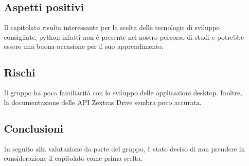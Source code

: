 \documentclass[../studio_di_fattibilita.tex]{subfiles}
\begin{document}
\subsection{Aspetti positivi}%
\label{sub:c7_aspetti_positivi}
Il capitolato risulta interessante per la scelta delle tecnologie di sviluppo consigliate, python infatti non è presente nel nostro percorso di studi e potrebbe essere una buona occasione per il suo apprendimento.

\subsection{Rischi}%
\label{sub:c7_rischi}
Il gruppo ha poca familiarità con lo sviluppo delle applicazioni desktop. Inoltre, la documentazione delle API Zextras Drive sembra poco accurata.
\subsection{Conclusioni}%
\label{sub:c7_conclusioni}
In seguito alla valutazione da parte del gruppo, è stato deciso di non prendere in considerazione il capitolato come prima scelta.
\end{document}
